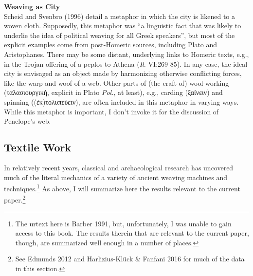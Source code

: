 \documentclass[12pt]{article}
\begin{document}
\noindent \hfill \par
\noindent \textbf{Weaving as City} \\
Scheid and Svenbro (1996) detail a metaphor in which the city is likened to a woven cloth. Supposedly, this metaphor was ``a linguistic fact that was likely to underlie the idea of political weaving for all Greek speakers'', but most of the explicit examples come from post-Homeric sources, including Plato and Aristophanes. There may be some distant, underlying links to Homeric texts, e.g., in the Trojan offering of a peplos to Athena (\textit{Il.} VI:269-85). In any case, the ideal city is envisaged as an object made by harmonizing otherwise conflicting forces, like the warp and woof of a web. Other parts of (the craft of) wool-working (ταλασιουργική, explicit in Plato \textit{Pol.}, at least), e.g., carding (ξαίνειν) and spinning ((ἐκ)τολυπεύειν), are often included in this metaphor in varying ways. While this metaphor is important, I don't invoke it for the discussion of Penelope's web.

\subsection{Textile Work}

In relatively recent years, classical and archaeological research has uncovered much of the literal mechanics of a variety of ancient weaving machines and techniques.\footnote{ The urtext here is Barber 1991, but, unfortunately, I was unable to gain access to this book. The results therein that are relevant to the current paper, though, are summarized well enough in a number of places.} As above, I will summarize here the results relevant to the current paper.\footnote{ See Edmunds 2012 and  Harlizius-Kl\"{u}ck \& Fanfani 2016 for much of the data in this section.}
\end{document}
